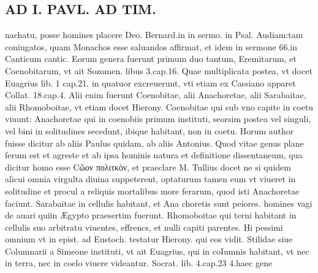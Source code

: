 \documentclass{article}
\begin{document}
\begin{pages}
\section*{AD I. PAVL. AD TIM. }
\marginpar{[ p.218 ]}\pstart nachatu, posse homines placere Deo. Bernard.in in sermo. in Psal. Audiam:tam coniugatos, quam Monachos esse saluandos affirmat, et idem in sermone 66.in Canticum cantic. Eorum genera fuerunt primum duo tantum, Eremitarum, et Coenobitarum, vt ait Sozomen. libus 3.cap.16. Quae multiplicata postea, vt docet Euagrius lib. 1 cap.21. in quatuor excreuerunt, vti etiam ex Cassiano apparet Collat. 18.cap.4. Alii enim fuerunt Coenobitae, alii Anachoretae, alii Sarabaitae, alii Rhomoboitae, vt etiam docet Hierony. Coenobitae qui sub vno capite in coetu viuunt: Anachoretae qui in coenobiis primum instituti, seorsim postea vel singuli, vel bini in solitudines secedunt, ibique habitant, non in coetu. Horum author fuisse dicitur ab aliis Paulus quidam, ab aliis Antonius. Quod vitae genus plane ferum est et agreste et ab ipsa hominis natura et definitione dissentaneum, qua dicitur homo esse Cῶον πολιτκὸν, et praeclare M. Tullius docet ne si quidem alicui omnia virgulta diuina suppeterent, optaturum tamen eum vt viueret in solitudine et procul a reliquis mortalibus more ferarum, quod isti Anachoretae faciunt. Sarabaitae in cellulis habitant, et Ana choretis sunt peiores. homines vagi de auari quiin Ægypto praesertim fuerunt. Rhomoboitae qui terni habitant in cellulis suo arbitratu viuentes, effrencs, et nulli capiti parentes. Hi pessimi omnium vt in epist. ad Eustoch. testatur Hierony. qui eos vidit. Stilidae siue Columnarii a Simeone instituti, vt ait Euagrius, qui in coIumnis habitant, vt nec in terra, nec in coelo viuere videantur. Socrat. lib. 4.cap.23 4.haec gene\pend

\end{pages}
\end{document}
